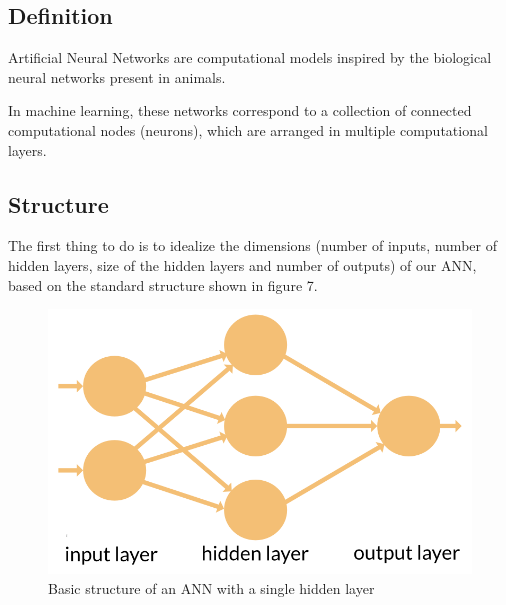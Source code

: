 \documentclass[conference]{IEEEtran}
\begin{document}
\subsection{Definition}\label{ANNdef}
Artificial Neural Networks are computational models inspired by the biological neural networks present in animals. 
\par In machine learning, these networks correspond to a collection of connected computational nodes (neurons), which are arranged in multiple computational layers.

\subsection{Structure}
The first thing to do is to idealize the dimensions (number of inputs, number of hidden layers, size of the hidden layers and number of outputs) of our ANN, based on the standard structure shown in figure 7.

\begin{figure}[H]
\centering
\includegraphics[scale=0.25]{ANNstruct.png}
\caption{Basic structure of an ANN with a single hidden layer}
\label{fig7}
\end{figure}
\end{document}
